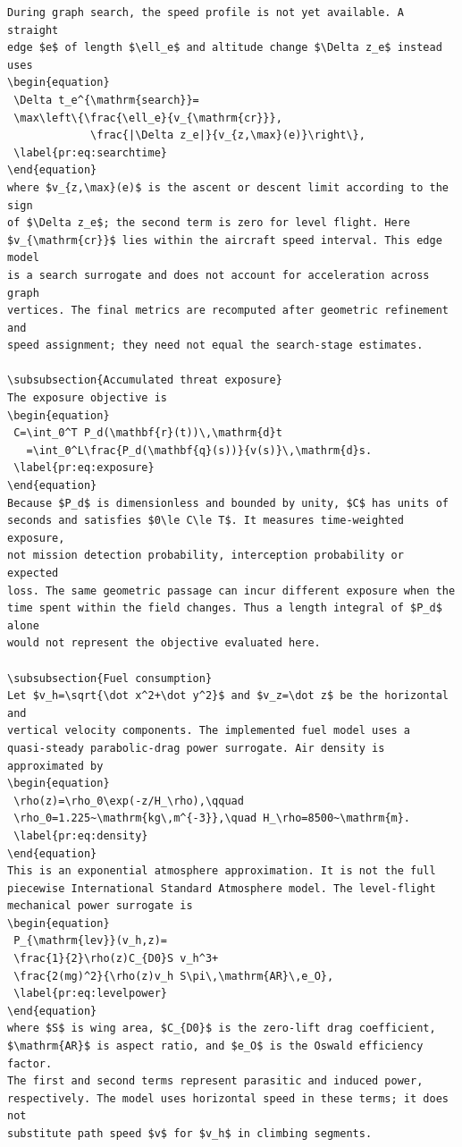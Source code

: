 \documentclass[12pt]{article}
\begin{document}
\begin{verbatim}
During graph search, the speed profile is not yet available. A straight
edge $e$ of length $\ell_e$ and altitude change $\Delta z_e$ instead uses
\begin{equation}
 \Delta t_e^{\mathrm{search}}=
 \max\left\{\frac{\ell_e}{v_{\mathrm{cr}}},
             \frac{|\Delta z_e|}{v_{z,\max}(e)}\right\},
 \label{pr:eq:searchtime}
\end{equation}
where $v_{z,\max}(e)$ is the ascent or descent limit according to the sign
of $\Delta z_e$; the second term is zero for level flight. Here
$v_{\mathrm{cr}}$ lies within the aircraft speed interval. This edge model
is a search surrogate and does not account for acceleration across graph
vertices. The final metrics are recomputed after geometric refinement and
speed assignment; they need not equal the search-stage estimates.

\subsubsection{Accumulated threat exposure}
The exposure objective is
\begin{equation}
 C=\int_0^T P_d(\mathbf{r}(t))\,\mathrm{d}t
   =\int_0^L\frac{P_d(\mathbf{q}(s))}{v(s)}\,\mathrm{d}s.
 \label{pr:eq:exposure}
\end{equation}
Because $P_d$ is dimensionless and bounded by unity, $C$ has units of
seconds and satisfies $0\le C\le T$. It measures time-weighted exposure,
not mission detection probability, interception probability or expected
loss. The same geometric passage can incur different exposure when the
time spent within the field changes. Thus a length integral of $P_d$ alone
would not represent the objective evaluated here.

\subsubsection{Fuel consumption}
Let $v_h=\sqrt{\dot x^2+\dot y^2}$ and $v_z=\dot z$ be the horizontal and
vertical velocity components. The implemented fuel model uses a
quasi-steady parabolic-drag power surrogate. Air density is approximated by
\begin{equation}
 \rho(z)=\rho_0\exp(-z/H_\rho),\qquad
 \rho_0=1.225~\mathrm{kg\,m^{-3}},\quad H_\rho=8500~\mathrm{m}.
 \label{pr:eq:density}
\end{equation}
This is an exponential atmosphere approximation. It is not the full
piecewise International Standard Atmosphere model. The level-flight
mechanical power surrogate is
\begin{equation}
 P_{\mathrm{lev}}(v_h,z)=
 \frac{1}{2}\rho(z)C_{D0}S v_h^3+
 \frac{2(mg)^2}{\rho(z)v_h S\pi\,\mathrm{AR}\,e_O},
 \label{pr:eq:levelpower}
\end{equation}
where $S$ is wing area, $C_{D0}$ is the zero-lift drag coefficient,
$\mathrm{AR}$ is aspect ratio, and $e_O$ is the Oswald efficiency factor.
The first and second terms represent parasitic and induced power,
respectively. The model uses horizontal speed in these terms; it does not
substitute path speed $v$ for $v_h$ in climbing segments.


\end{verbatim}
\end{document}

